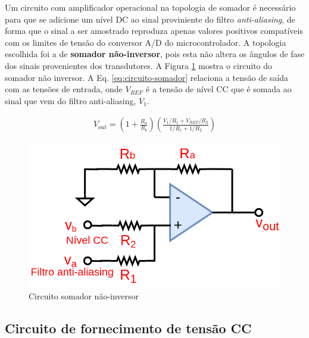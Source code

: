 Um circuito com amplificador operacional na topologia de somador é necessário para que se adicione um nível DC ao sinal proviniente do filtro \textit{anti-aliasing}, de forma que o sinal a ser amostrado reproduza apenas valores positivos compatíveis com os limites de tensão do conversor A/D do microcontrolador. 
A topologia escolhida foi a de \textbf{somador não-inversor}, pois esta não altera os ângulos de fase dos sinais provenientes dos transdutores. A Figura \ref{fig:somador-ninversor} mostra o circuito do somador não inversor. A Eq. \ref{eq:circuito-somador} relaciona a tensão de saída com as tensões de entrada, onde $V_{REF}$ é a tensão de nível CC que é somada ao sinal que vem do filtro anti-aliasing, $V_1$.

\begin{align}
	V_{out} = \left(1+\frac{R_a}{R_b}\right)\left(\frac{V_1/R_1 + V_{REF}/R_2}{1/R_1 + 1/R_2}\right)\label{eq:circuito-somador}
\end{align}

\begin{figure}[!hbt]
	\begin{center}
		\includegraphics[scale=0.25]{figuras/Somador_Nao-Inversor.png}
		\caption{Circuito somador não-inversor}
		\label{fig:somador-ninversor}
	\end{center}
\end{figure}

\subsection{Circuito de fornecimento de tensão CC}

